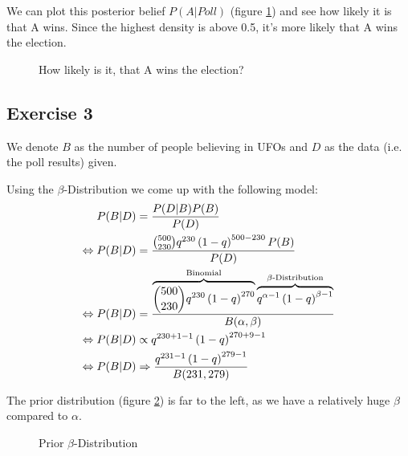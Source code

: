 We can plot this posterior belief $P(A|Poll)$ (figure \ref{fig:2014-05-30_ex2plot}) and see how likely it is that A wins. Since the highest density is above 0.5, it's more likely that A wins the election.
\begin{figure}[!ht]
\centering
{}
\caption{How likely is it, that A wins the election?}
\label{fig:2014-05-30_ex2plot}
\end{figure}


\subsection*{Exercise 3}
We denote $B$ as the number of people believing in UFOs and $D$ as the data (i.e. the poll results) given.

Using the $\beta$-Distribution we come up with the following model:
\begin{align*}\index{Binomial Distribution}
                P(B|D) &= \frac{P(D|B)P(B)}{P(D)} \\
\Leftrightarrow P(B|D) &= \frac{\binom{500}{230}q^{230}\left(1-q\right)^{500-230}P(B)}{P(D)}\\
\Leftrightarrow P(B|D) &= \frac{\overbrace{\binom{500}{230}q^{230}\left(1-q\right)^{270}}^\text{Binomial} \overbrace{q^{\alpha-1}\left(1-q\right)^{\beta-1}}^\text{$\beta$-Distribution}}{B(\alpha,\beta)} \\
\Leftrightarrow P(B|D) &\propto q^{230+1-1}\left(1-q\right)^{270+9-1} \\
\Leftrightarrow P(B|D) &\Rightarrow \frac{q^{231-1}\left(1-q\right)^{279-1}}{B(231,279)}
\end{align*}

The prior distribution (figure \ref{fig:2014-05-30_ex3prior}) is far to the left, as we have a relatively huge $\beta$ compared to $\alpha$.
\begin{figure}[!ht]
\centering
{}
\caption{Prior $\beta$-Distribution}
\label{fig:2014-05-30_ex3prior}
\end{figure}

